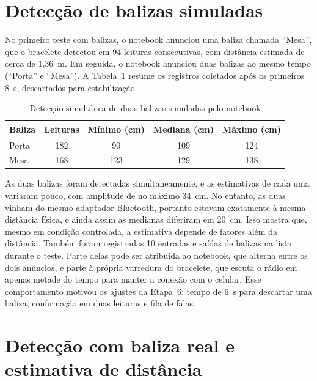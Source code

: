 \section{Detecção de balizas simuladas}
\label{sec:res-simuladas}

No primeiro teste com balizas, o notebook anunciou uma baliza chamada ``Mesa'', que o bracelete detectou em 94 leituras consecutivas, com distância estimada de cerca de 1,36~m. Em seguida, o notebook anunciou duas balizas ao mesmo tempo (``Porta'' e ``Mesa''). A Tabela~\ref{tab:duas-balizas} resume os registros coletados após os primeiros 8~s, descartados para estabilização.

\begin{table}[htb]
\centering
\caption{Detecção simultânea de duas balizas simuladas pelo notebook}
\label{tab:duas-balizas}
\small
\begin{tabular}{lcccc}
\toprule
\textbf{Baliza} & \textbf{Leituras} & \textbf{Mínimo (cm)} & \textbf{Mediana (cm)} & \textbf{Máximo (cm)} \\
\midrule
Porta & 182 & 90 & 109 & 124 \\
Mesa & 168 & 123 & 129 & 138 \\
\bottomrule
\end{tabular}
\normalsize
{}
\end{table}

As duas balizas foram detectadas simultaneamente, e as estimativas de cada uma variaram pouco, com amplitude de no máximo 34~cm. No entanto, as duas vinham do mesmo adaptador Bluetooth, portanto estavam exatamente à mesma distância física, e ainda assim as medianas diferiram em 20~cm. Isso mostra que, mesmo em condição controlada, a estimativa depende de fatores além da distância. Também foram registradas 10 entradas e saídas de balizas na lista durante o teste. Parte delas pode ser atribuída ao notebook, que alterna entre os dois anúncios, e parte à própria varredura do bracelete, que escuta o rádio em apenas metade do tempo para manter a conexão com o celular. Esse comportamento motivou os ajustes da Etapa~6: tempo de 6~s para descartar uma baliza, confirmação em duas leituras e fila de falas.

\section{Detecção com baliza real e estimativa de distância}
\label{sec:res-real}

